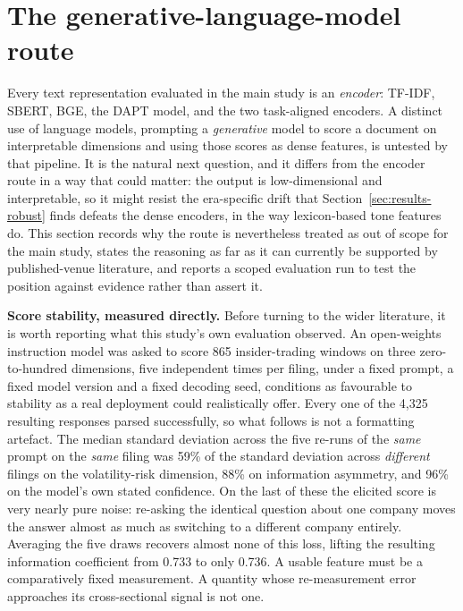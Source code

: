 \documentclass[logo,msc,ai]{infthesis}        %
\begin{document}
\section{The generative-language-model route}
\label{sec:llm-route}
Every text representation evaluated in the main study is an \emph{encoder}: TF-IDF, SBERT, BGE, the DAPT model, and the two task-aligned encoders. A distinct use of language models, prompting a \emph{generative} model to score a document on interpretable dimensions and using those scores as dense features, is untested by that pipeline. It is the natural next question, and it differs from the encoder route in a way that could matter: the output is low-dimensional and interpretable, so it might resist the era-specific drift that Section~\ref{sec:results-robust} finds defeats the dense encoders, in the way lexicon-based tone features do. This section records why the route is nevertheless treated as out of scope for the main study, states the reasoning as far as it can currently be supported by published-venue literature, and reports a scoped evaluation run to test the position against evidence rather than assert it.

\textbf{Score stability, measured directly.} Before turning to the wider literature, it is worth reporting what this study's own evaluation observed. An open-weights instruction model was asked to score 865 insider-trading windows on three zero-to-hundred dimensions, five independent times per filing, under a fixed prompt, a fixed model version and a fixed decoding seed, conditions as favourable to stability as a real deployment could realistically offer. Every one of the 4,325 resulting responses parsed successfully, so what follows is not a formatting artefact. The median standard deviation across the five re-runs of the \emph{same} prompt on the \emph{same} filing was 59\% of the standard deviation across \emph{different} filings on the volatility-risk dimension, 88\% on information asymmetry, and 96\% on the model's own stated confidence. On the last of these the elicited score is very nearly pure noise: re-asking the identical question about one company moves the answer almost as much as switching to a different company entirely. Averaging the five draws recovers almost none of this loss, lifting the resulting information coefficient from 0.733 to only 0.736. A usable feature must be a comparatively fixed measurement. A quantity whose re-measurement error approaches its cross-sectional signal is not one.
\end{document}

